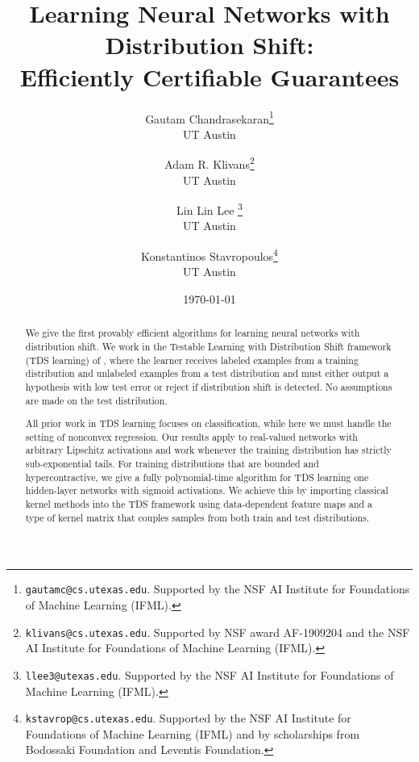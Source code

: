 \documentclass[11pt]{article} %
\title{Learning Neural Networks with Distribution Shift: \\Efficiently Certifiable Guarantees}
\author{
     Gautam Chandrasekaran\thanks{\texttt{gautamc@cs.utexas.edu}. Supported by the NSF AI Institute for Foundations of Machine Learning (IFML).} \\ UT Austin
     \and Adam R. Klivans\thanks{\texttt{klivans@cs.utexas.edu}. Supported by NSF award AF-1909204 and the NSF AI Institute for Foundations of Machine Learning (IFML).} \\
	 UT Austin
     \and Lin Lin Lee \thanks{\texttt{llee3@utexas.edu}. Supported by the NSF AI Institute for Foundations of Machine Learning (IFML).} \\ UT Austin
	 \and Konstantinos Stavropoulos\thanks{\texttt{kstavrop@cs.utexas.edu}. Supported by the NSF AI Institute for Foundations of Machine Learning (IFML) and by scholarships from Bodossaki Foundation and Leventis Foundation.} \\
	 UT Austin
}
\date{\today}
\numberwithin{equation}{section}
\begin{document}
\maketitle
\begin{abstract}
We give the first provably efficient algorithms for learning neural networks with distribution shift. We work in the Testable Learning with Distribution Shift  framework (TDS learning) of \cite{klivans2023testable}, where the learner receives labeled examples from a training distribution and unlabeled examples from a test distribution and must either output a hypothesis with low test error or reject if distribution shift is detected.  No assumptions are made on the test distribution. 

All prior work in TDS learning focuses on classification, while here we must handle the setting of nonconvex regression. Our results apply to real-valued networks with arbitrary Lipschitz activations and work whenever the training distribution has strictly sub-exponential tails. For training distributions that are bounded and hypercontractive, we give a fully polynomial-time algorithm for TDS learning one hidden-layer networks with sigmoid activations. We achieve this by importing classical kernel methods into the TDS framework using data-dependent feature maps and a type of kernel matrix that couples samples from both train and test distributions. 


\end{abstract}
\end{document}
